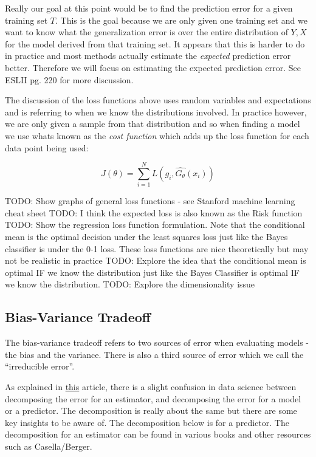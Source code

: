 Really our goal at this point would be to find the prediction error for a given training set $T$. This is the goal because we are only given one training set and we want to know what the generalization error is over the entire distribution of $Y, X$ for the model derived from that training set. It appears that this is harder to do in practice and most methods actually estimate the \emph{expected} prediction error better. Therefore we will focus on estimating the expected prediction error. See ESLII pg. 220 for more discussion.

The discussion of the loss functions above uses random variables and expectations and is referring to when we know the distributions involved. In practice however, we are only given a sample from that distribution and so when finding a model we use whats known as the \emph{cost function} which adds up the loss function for each data point being used:

\begin{equation}
J(\theta) = \sum_{i=1}^{N}{L(g_i, \hat{G_\theta}(x_i))}
\end{equation}



\noindent TODO: Show graphs of general loss functions - see Stanford machine learning cheat sheet \newline
TODO: I think the expected loss is also known as the Risk function \newline
TODO: Show the regression loss function formulation. Note that the conditional mean is the optimal decision under the least squares loss just like the Bayes classifier is under the 0-1 loss. These loss functions are nice theoretically but may not be realistic in practice \newline
TODO: Explore the idea that the conditional mean is optimal IF we know the distribution just like the Bayes Classifier is optimal IF we know the distribution. \newline
TODO: Explore the dimensionality issue

\subsection{Bias-Variance Tradeoff}

The bias-variance tradeoff refers to two sources of error when evaluating models - the bias and the variance. There is also a third source of error which we call the ``irreducible error''. 

As explained in \href{https://towardsdatascience.com/mse-and-bias-variance-decomposition-77449dd2ff55}{this} article, there is a slight confusion in data science between decomposing the error for an \gls{estimator}, and decomposing the error for a model or a predictor. The decomposition is really about the same but there are some key insights to be aware of. The decomposition below is for a predictor. The decomposition for an estimator can be found in various books and other resources such as Casella/Berger. 

